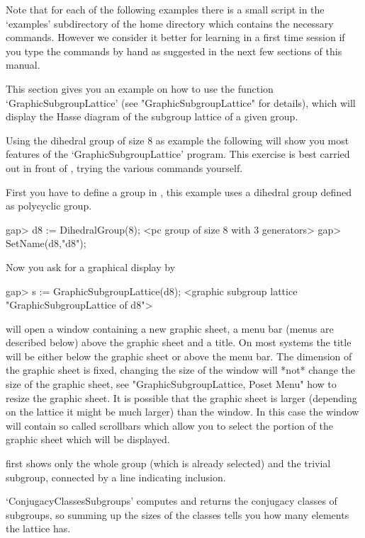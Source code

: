 Note that for each of the following examples there is a small {\GAP}
script in the `examples' subdirectory of the {\XGAP} home directory
which contains the necessary commands. However we consider it better
for learning {\XGAP} in a first time session if you type the commands
by hand as suggested in the next few sections of this manual.



This  section   gives  you an   example    on how  to    use the function
`GraphicSubgroupLattice' (see "GraphicSubgroupLattice" for  details), which 
will  display the Hasse diagram of the subgroup lattice of a given group.

Using the dihedral group of size $8$ as example the following will show you
most features of the `GraphicSubgroupLattice' program.  This exercise is
best carried out in front of {\XGAP}, trying the various commands yourself.

First  you   have to define a  group   in {\GAP},  this example  uses a
dihedral group defined as polycyclic group.

\begintt
gap> d8 := DihedralGroup(8);
<pc group of size 8 with 3 generators>
gap> SetName(d8,"d8");
\endtt

Now you ask for a graphical display by

\begintt
gap> s := GraphicSubgroupLattice(d8);
<graphic subgroup lattice "GraphicSubgroupLattice of d8">
\endtt

{\XGAP} will open a window containing a new graphic sheet, a menu bar
(menus are described below) above the graphic sheet and a title.  On most
systems the title will be either below the graphic sheet or above the menu
bar.  The dimension of the graphic sheet is fixed, changing the size of the
window will *not* change the size of the graphic sheet, see
"GraphicSubgroupLattice, Poset Menu" how to resize the graphic sheet.  It
is possible that the graphic sheet is larger (depending on the lattice it
might be much larger) than the window.  In this case the window will
contain so called scrollbars which allow you to select the portion of the
graphic sheet which will be displayed. 

{\XGAP} first shows only the whole group (which is already selected) and
the trivial subgroup, connected by a line indicating inclusion. 

`ConjugacyClassesSubgroups' computes and returns the conjugacy classes of
subgroups, so summing  up the sizes  of the classes   tells you how  many
elements the lattice has.

